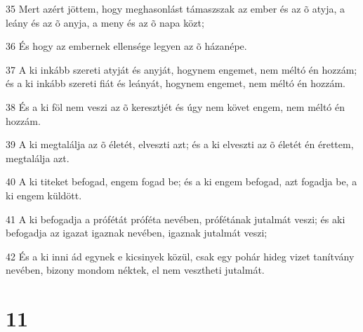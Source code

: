 \par 35 Mert azért jöttem, hogy meghasonlást támaszszak az ember és az õ atyja, a leány és az õ anyja, a meny és az õ napa közt;
\par 36 És hogy az embernek ellensége legyen az õ házanépe.
\par 37 A ki inkább szereti atyját és anyját, hogynem engemet, nem méltó én hozzám; és a ki inkább szereti fiát és leányát, hogynem engemet, nem méltó én hozzám.
\par 38 És a ki föl nem veszi az õ keresztjét és úgy nem követ engem, nem méltó én hozzám.
\par 39 A ki megtalálja az õ életét, elveszti azt; és a ki elveszti az õ életét én érettem, megtalálja azt.
\par 40 A ki titeket befogad, engem fogad be; és a ki engem befogad, azt fogadja be, a ki engem küldött.
\par 41 A ki befogadja a prófétát próféta nevében, prófétának jutalmát veszi; és aki befogadja az igazat igaznak nevében, igaznak jutalmát veszi;
\par 42 És a ki inni ád egynek e kicsinyek közül, csak egy pohár hideg vizet tanítvány nevében, bizony mondom néktek, el nem vesztheti jutalmát.

\chapter{11}

